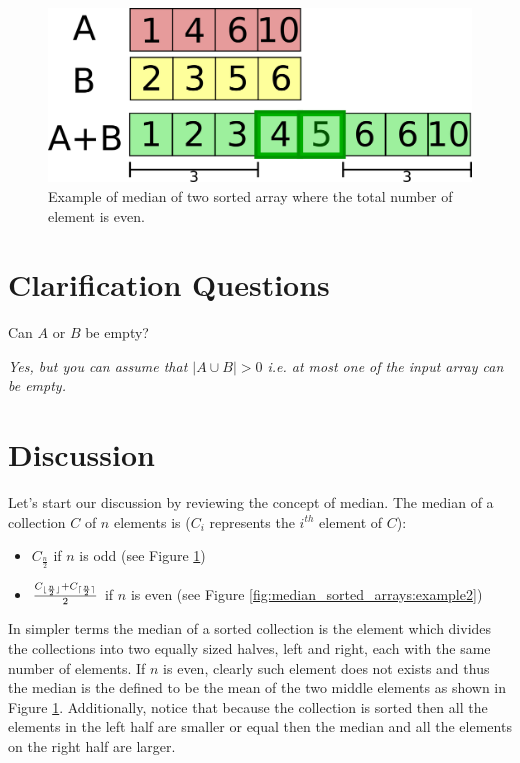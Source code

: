 \begin{figure}
	\label{fig:median_sorted_arrays:example1}
	\centering
	\includegraphics[scale=1.0]{sources/median_sorted_arrays/images/example1}
	\caption[Example of median of two sorted array.]{Example of median of two sorted array where the total number of element is even.}
\end{figure}


\section{Clarification Questions}

\begin{QandA}
	\item Can $A$ or $B$ be empty?
	\begin{answered}
		\textit{Yes, but you can assume that $|A \cup B| > 0$ i.e. at most one of the input array can be empty.}
	\end{answered}
	
\end{QandA}

\section{Discussion}
\label{median_sorted_arrays:sec:discussion}
Let's start our discussion by reviewing the concept of median. The median of a collection $C$ of $n$
elements is ($C_i$ represents the $i^{th}$ element of $C$):
\begin{itemize}
	\item $C_{\frac{n}{2}}$ if $n$ is odd (see Figure \ref{fig:median_sorted_arrays:example1})
	\item $\frac{C_{\lfloor\frac{n}{2}\rfloor}+C_{\lceil\frac{n}{2}\rceil}}{2}$ if $n$ is even (see Figure
	\ref{fig:median_sorted_arrays:example2})
\end{itemize}
In simpler terms the median of a sorted collection is the element which divides the collections into
two equally sized halves, left and right, each with the same number of elements. 
If $n$ is even, clearly such element does not exists and thus the median is the defined to be the mean of the two middle
elements as shown in Figure \ref{fig:median_sorted_arrays:example1}.
Additionally, notice that because the collection is sorted then all the elements in the left half are smaller or equal then
the median and all the elements on the right half are larger. 

